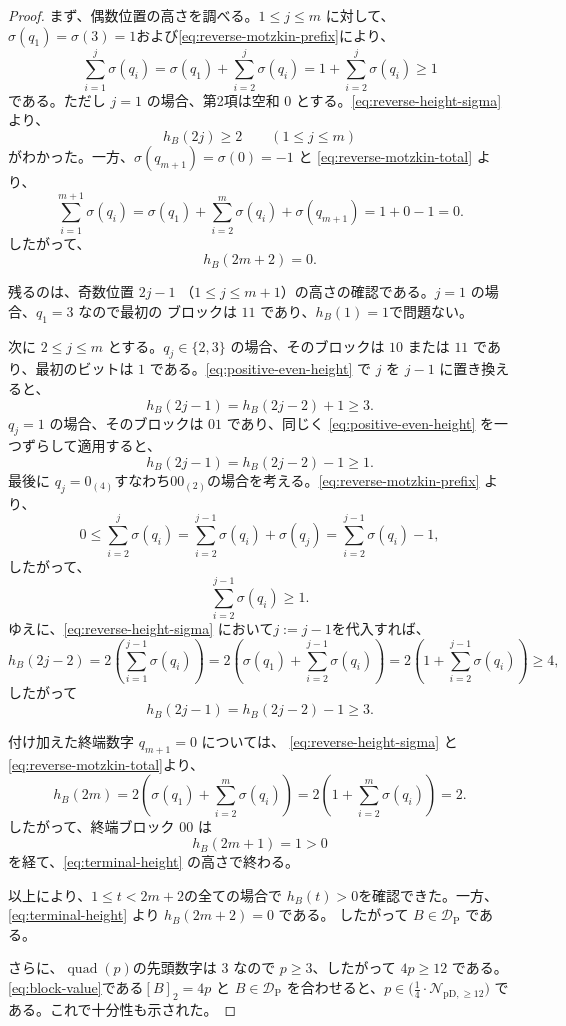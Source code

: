 \documentclass[12pt]{ltjsarticle}
\theoremstyle{plain}
\theoremstyle{definition}
\theoremstyle{plain}
\newcommand{\DP}{\mathcal{D}_{\mathrm{P}}}
\newcommand{\Pset}{%
  \bigl(\tfrac{1}{4}\cdot\mathcal{N}_{\mathrm{pD},\geq 12}\bigr)%
}
\begin{document}
\begin{proof}
まず、偶数位置の高さを調べる。$1\leq j\leq m$ に対して、$\sigma(q_1)=\sigma(3)=1$および\eqref{eq:reverse-motzkin-prefix}により、
\[
 \sum_{i=1}^{j}\sigma(q_i)
 = \sigma(q_1)+\sum_{i=2}^{j}\sigma(q_i)
=1+\sum_{i=2}^{j}\sigma(q_i)
 \geq1
\]
である。ただし $j=1$ の場合、第2項は空和 $0$ とする。\eqref{eq:reverse-height-sigma}より、
\begin{equation}\label{eq:positive-even-height}
 h_B(2j)\geq2
 \qquad(1\leq j\leq m)
\end{equation}
がわかった。一方、$\sigma(q_{m+1})=\sigma(0)=-1$ と
\eqref{eq:reverse-motzkin-total} より、
\[
 \sum_{i=1}^{m+1}\sigma(q_i)
 = \sigma(q_1)+\sum_{i=2}^{m}\sigma(q_i)+\sigma(q_{m+1})
 =1+0-1=0.
\]
したがって、
\begin{equation}\label{eq:terminal-height}
 h_B(2m+2)=0.
\end{equation}

残るのは、奇数位置 $2j-1$
（$1\leq j\leq m+1$）の高さの確認である。$j=1$ の場合、$q_1=3$ なので最初の
ブロックは $11$ であり、$ h_B(1)=1$で問題ない。

次に $2\leq j\leq m$ とする。$q_j\in\{2,3\}$ の場合、そのブロックは $10$ または
$11$ であり、最初のビットは $1$ である。\eqref{eq:positive-even-height} で $j$ を
$j-1$ に置き換えると、
\[
 h_B(2j-1)=h_B(2j-2)+1\geq3.
\]
$q_j=1$ の場合、そのブロックは $01$ であり、同じく
\eqref{eq:positive-even-height} を一つずらして適用すると、
\[
 h_B(2j-1)=h_B(2j-2)-1\geq1.
\]
最後に $q_j=0_{(4)}$すなわち$00_{(2)}$の場合を考える。\eqref{eq:reverse-motzkin-prefix} より、
\[
 0\leq\sum_{i=2}^{j}\sigma(q_i)
 =\sum_{i=2}^{j-1}\sigma(q_i)+\sigma(q_j)=\sum_{i=2}^{j-1}\sigma(q_i)-1,
\]
したがって、
\[
 \sum_{i=2}^{j-1}\sigma(q_i)\geq1.
\]
ゆえに、\eqref{eq:reverse-height-sigma} において$j:=j-1$を代入すれば、
\[
 h_B(2j-2)
   =2\left(\sum_{i=1}^{j-1}\sigma(q_i)\right) =2\left(\sigma(q_1)+\sum_{i=2}^{j-1}\sigma(q_i)\right)=2\left(1+\sum_{i=2}^{j-1}\sigma(q_i)\right)
 \geq4,
\]
したがって
\[
 h_B(2j-1)=h_B(2j-2)-1\geq3.
\]

付け加えた終端数字 $q_{m+1}=0$ については、
  \eqref{eq:reverse-height-sigma} と\eqref{eq:reverse-motzkin-total}より、
\[
 h_B(2m)=2\left(\sigma(q_1)+\sum_{i=2}^{m}\sigma(q_i)\right)=2\left(1+\sum_{i=2}^{m}\sigma(q_i)\right)=2.
\]
したがって、終端ブロック $00$ は
\[
 h_B(2m+1)=1>0
\]
を経て、\eqref{eq:terminal-height} の高さで終わる。

以上により、$1\leq t<2m+2$の全ての場合で
$ h_B(t)>0$を確認できた。一方、\eqref{eq:terminal-height} より $h_B(2m+2)=0$ である。
したがって $B\in\DP$ である。

さらに、$\operatorname{quad}(p)$の先頭数字は $3$ なので $p\geq3$、したがって
$4p\geq12$ である。\eqref{eq:block-value}である$[B]_2=4p$ と $B\in\DP$ を合わせると、$p\in\Pset$ である。これで十分性も示された。
\end{proof}
\end{document}
